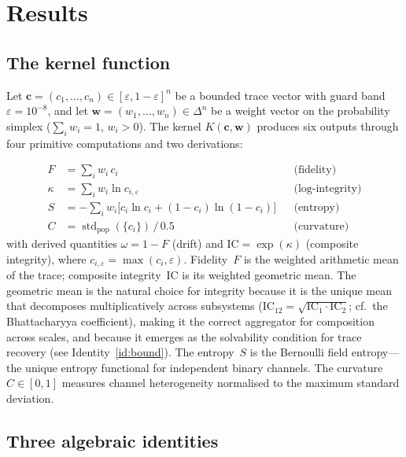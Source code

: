 \documentclass[
  aps,
  prx,
  twocolumn,
  superscriptaddress,
  nofootinbib,
  floatfix
]{revtex4-2}
\newcommand{\eps}{\varepsilon}
\newcommand{\IC}{\mathrm{IC}}
\newcommand{\tvec}{\mathbf{c}}
\newcommand{\wvec}{\mathbf{w}}
\DeclareMathOperator{\std}{std}
\begin{document}
\section{Results}

\subsection{The kernel function}

Let $\tvec = (c_1, \ldots, c_n) \in [\eps, 1-\eps]^n$ be a bounded
trace vector with guard band $\eps = 10^{-8}$, and let
$\wvec = (w_1, \ldots, w_n) \in \Delta^n$ be a weight vector on the
probability simplex ($\sum_i w_i = 1$, $w_i > 0$). The kernel
$K(\tvec, \wvec)$ produces six outputs through four primitive
computations and two derivations:

\begin{align}
  F &= \textstyle\sum_i w_i \, c_i
    && \text{(fidelity)} \label{eq:F} \\
  \kappa &= \textstyle\sum_i w_i \ln c_{i,\eps}
    && \text{(log-integrity)} \label{eq:kappa} \\
  S &= -\textstyle\sum_i w_i \bigl[c_i \ln c_i + (1{-}c_i)\ln(1{-}c_i)\bigr]
    && \text{(entropy)} \label{eq:S} \\
  C &= \std_{\mathrm{pop}}(\{c_i\})\,/\,0.5
    && \text{(curvature)} \label{eq:C}
\end{align}
with derived quantities $\omega = 1 - F$ (drift) and
$\IC = \exp(\kappa)$ (composite integrity), where
$c_{i,\eps} = \max(c_i, \eps)$. Fidelity~$F$ is the weighted
arithmetic mean of the trace; composite integrity~$\IC$ is its
weighted geometric mean. The geometric mean is the natural choice
for integrity because it is the unique mean that decomposes
multiplicatively across subsystems
($\IC_{12} = \sqrt{\IC_1 \cdot \IC_2}$; cf.\ the Bhattacharyya
coefficient), making it the correct aggregator for composition
across scales, and because it emerges as the solvability condition
for trace recovery (see Identity~\ref{id:bound}). The entropy~$S$
is the Bernoulli field entropy---the unique entropy functional for
independent binary channels. The curvature~$C \in [0,1]$ measures
channel heterogeneity normalised to the maximum standard deviation.

\subsection{Three algebraic identities}
\end{document}
